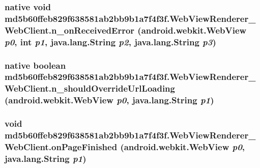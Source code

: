 \hypertarget{classmd5b60ffeb829f638581ab2bb9b1a7f4f3f_1_1_web_view_renderer___web_client_d79d7a4337743489ebd3c346104f6159}{
\subsubsection[{n\_\-onReceivedError}]{\setlength{\rightskip}{0pt plus 5cm}native void md5b60ffeb829f638581ab2bb9b1a7f4f3f.WebViewRenderer\_\-WebClient.n\_\-onReceivedError (android.webkit.WebView {\em p0}, \/  int {\em p1}, \/  java.lang.String {\em p2}, \/  java.lang.String {\em p3})}}
\label{classmd5b60ffeb829f638581ab2bb9b1a7f4f3f_1_1_web_view_renderer___web_client_d79d7a4337743489ebd3c346104f6159}


\hypertarget{classmd5b60ffeb829f638581ab2bb9b1a7f4f3f_1_1_web_view_renderer___web_client_e3e3c0ff01ff214273e665e88e187735}{
\subsubsection[{n\_\-shouldOverrideUrlLoading}]{\setlength{\rightskip}{0pt plus 5cm}native boolean md5b60ffeb829f638581ab2bb9b1a7f4f3f.WebViewRenderer\_\-WebClient.n\_\-shouldOverrideUrlLoading (android.webkit.WebView {\em p0}, \/  java.lang.String {\em p1})}}
\label{classmd5b60ffeb829f638581ab2bb9b1a7f4f3f_1_1_web_view_renderer___web_client_e3e3c0ff01ff214273e665e88e187735}


\hypertarget{classmd5b60ffeb829f638581ab2bb9b1a7f4f3f_1_1_web_view_renderer___web_client_b063610e154fb263a1a28d889d535cfe}{
\subsubsection[{onPageFinished}]{\setlength{\rightskip}{0pt plus 5cm}void md5b60ffeb829f638581ab2bb9b1a7f4f3f.WebViewRenderer\_\-WebClient.onPageFinished (android.webkit.WebView {\em p0}, \/  java.lang.String {\em p1})}}
\label{classmd5b60ffeb829f638581ab2bb9b1a7f4f3f_1_1_web_view_renderer___web_client_b063610e154fb263a1a28d889d535cfe}


